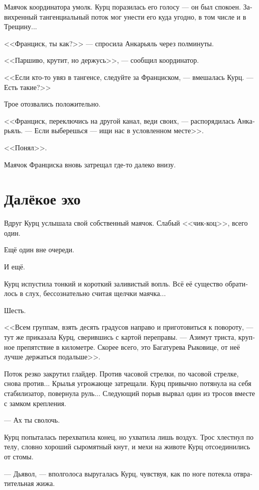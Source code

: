 \documentclass[a4paper,10pt,fleqn]{book}\usepackage{polyglossia}\setdefaultlanguage[babelshorthands=true]{russian}\setotherlanguage{english}\defaultfontfeatures{Ligatures=TeX,Mapping=tex-text}\usepackage{xcolor}\newcommand{\ml}[3]{#2}
\begin{document}
Маячок координатора умолк.
Курц поразилась его голосу --- он был спокоен.
Завихренный тангенциальный поток мог унести его куда угодно, в том числе и в Трещину...

<<Франциск, ты как?>> --- спросила Анкарьяль через полминуты.

<<Паршиво, крутит, но держусь>>, --- сообщил координатор.

<<Если кто-то увяз в тангенсе, следуйте за Франциском, --- вмешалась Курц.
--- Есть такие?>>

Трое отозвались положительно.

<<Франциск, переключись на другой канал, веди своих, --- распорядилась Анкарьяль.
--- Если выберешься --- ищи нас в условленном месте>>.

\ml{$0$}
{<<Понял>>.}
{``Roger that.''}

Маячок Франциска вновь затрещал где-то далеко внизу.

\section{Далёкое эхо}

Вдруг Курц услышала свой собственный маячок.
Слабый <<чик-коц>>, всего один.

Ещё один вне очереди.

И ещё.

Курц испустила тонкий и короткий заливистый вопль.
Всё её существо обратилось в слух, бессознательно считая щелчки маячка...

Шесть.

<<Всем группам, взять десять градусов направо и приготовиться к повороту, --- тут же приказала Курц, сверившись с картой переправы.
--- Азимут триста, крупное препятствие в километре.
\ml{$0$}
{Скорее всего, это Багатурева Рыковице, от неё лучше держаться подальше>>.}
{Most likely, it's Bagaturewa Rykovitze, better to keep a fair distance.''}

Поток резко закрутил глайдер.
Против часовой стрелки, по часовой стрелке, снова против...
Крылья угрожающе затрещали.
Курц привычно потянула на себя стабилизатор, повернула руль...
Следующий порыв вырвал один из тросов вместе с замком крепления.

--- Ах ты сволочь.

Курц попыталась перехватила конец, но ухватила лишь воздух.
Трос хлестнул по телу, словно хороший сыромятный кнут, и мехи на животе Курц отсоединились от стомы.

--- Дьявол, --- вполголоса выругалась Курц, чувствуя, как по ноге потекла отвратительная жижа.
\end{document}
